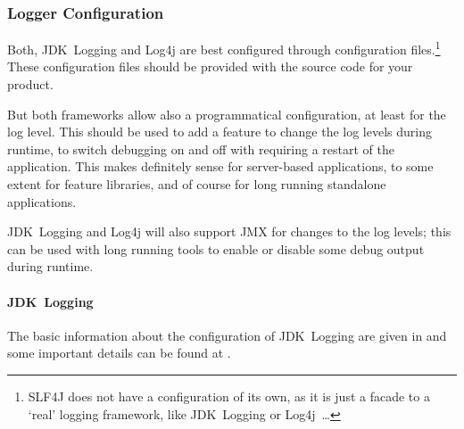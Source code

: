 \documentclass[11pt,a4paper, titlepage, parskip=half, headsepline, footsepline, cleardoublepage=current, headheight=1cm]{scrbook}
\begin{document}
\subsubsection{Logger Configuration}\label{sec:LoggerConfiguration}
Both, JDK~Logging and Log4j are best configured through configuration files.\footnote{SLF4J does not have a configuration of its own, as it is just a facade to a ‘real’ logging framework, like JDK~Logging or Log4j~…} These configuration files should be provided with the source code for your product.

But both frameworks allow also a programmatical configuration, at least for the log level. This should be used to add a feature to change the log levels during runtime, to switch debugging on and off with requiring a restart of the application. This makes definitely sense for server-based applications, to some extent for feature libraries, and of course for long running standalone applications.

JDK~Logging and Log4j will also support JMX for changes to the log levels\autocite{ORACLE_DOC_LOGGINGMXBEAN_INTERFACE, APACHE_LOG4J:JMX}; this can be used with long running tools to enable or disable some debug output during runtime.

\paragraph{JDK~Logging} The basic information about the configuration of JDK~Logging are given in \autocite{ORACLE_DOC_LOGGING_OVERVIEW:ConfigurationFile, ORACLE_DOC_LOGGING_OVERVIEW:DefaultConfiguration} and some important details can be found at \autocite{ORACLE_DOC_LOGMANAGER_CLASS}.
\end{document}
